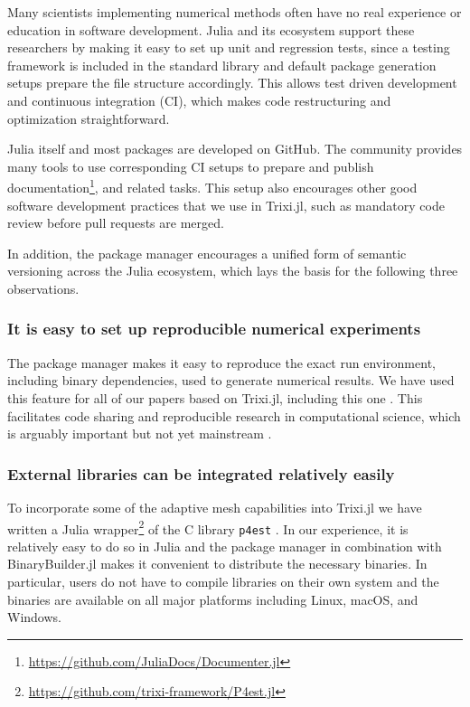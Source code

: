 \documentclass{juliacon}
\newcommand{\trixi}{Trixi.jl\xspace}
\begin{document}
Many scientists implementing numerical methods often have no real experience or
education in software development. Julia and its ecosystem support these
researchers by making it easy to set up unit and regression tests, since a
testing framework is included in the standard library and default package
generation setups prepare the file structure accordingly. This allows test
driven development and continuous integration (CI), which makes code restructuring
and optimization straightforward.

Julia itself and most packages are developed on GitHub. The community provides
many tools to use corresponding CI setups to prepare and publish
documentation\footnote{\url{https://github.com/JuliaDocs/Documenter.jl}},
and related tasks. This setup also encourages other good software development
practices that we use in \trixi, such as mandatory code review before pull requests
are merged.

In addition, the package manager encourages a unified form of semantic versioning
across the Julia ecosystem, which lays the basis for the following three
observations.

\subsubsection{It is easy to set up reproducible numerical experiments}

The package manager makes it easy to reproduce the exact run environment, including
binary dependencies, used to generate numerical results. We have used this feature for all of our papers based on
\trixi \cite{schlottkelakemper2021purely, ranocha2021preventing}, including this
one \cite{ranocha2021adaptiveRepro}.
This facilitates code sharing and reproducible research in computational science,
which is arguably important but not yet mainstream \cite{barnes2010publish,
donoho2010invitation, leveque2013top}.

\subsubsection{External libraries can be integrated relatively easily}

To incorporate some of the adaptive mesh capabilities into \trixi
we have written a Julia wrapper\footnote{\url{https://github.com/trixi-framework/P4est.jl}}
of the C library \texttt{p4est} \cite{burstedde2011p4est}. In our experience,
it is relatively easy to do so in Julia and the package manager in combination
with BinaryBuilder.jl makes it convenient to distribute the necessary binaries.
In particular, users do not have to compile libraries on their own system
and the binaries are available on all major platforms including Linux, macOS,
and Windows.
\end{document}
